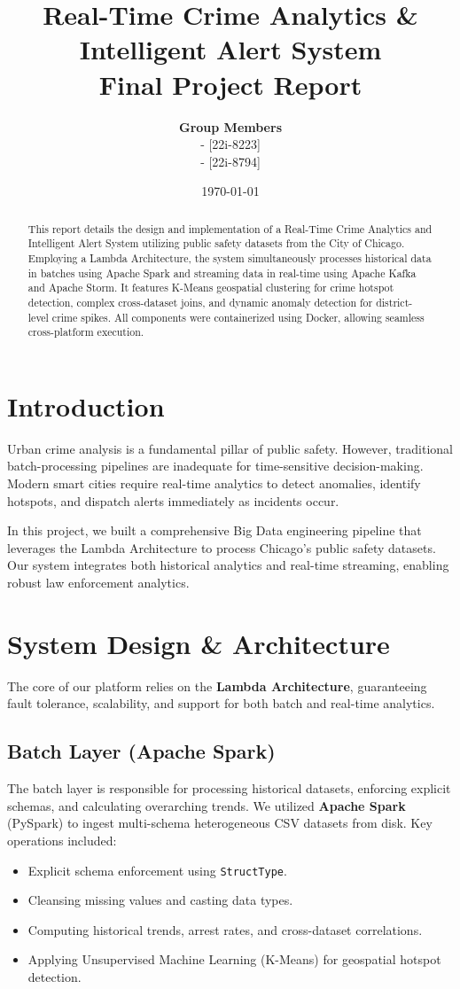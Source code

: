 \documentclass[12pt]{article}
\title{\textbf{Real-Time Crime Analytics \& Intelligent Alert System}\\
\Large Final Project Report}
\author{
    \textbf{Group Members}\\
    [Sameed Ahmed Siddiqui] - [22i-8223]\\
    [Junaid Zeb] - [22i-8794]
}
\date{\today}
\begin{document}
\maketitle

\begin{abstract}
This report details the design and implementation of a Real-Time Crime Analytics and Intelligent Alert System utilizing public safety datasets from the City of Chicago. Employing a Lambda Architecture, the system simultaneously processes historical data in batches using Apache Spark and streaming data in real-time using Apache Kafka and Apache Storm. It features K-Means geospatial clustering for crime hotspot detection, complex cross-dataset joins, and dynamic anomaly detection for district-level crime spikes. All components were containerized using Docker, allowing seamless cross-platform execution.
\end{abstract}

\tableofcontents
\newpage

\section{Introduction}
Urban crime analysis is a fundamental pillar of public safety. However, traditional batch-processing pipelines are inadequate for time-sensitive decision-making. Modern smart cities require real-time analytics to detect anomalies, identify hotspots, and dispatch alerts immediately as incidents occur. 

In this project, we built a comprehensive Big Data engineering pipeline that leverages the Lambda Architecture to process Chicago's public safety datasets. Our system integrates both historical analytics and real-time streaming, enabling robust law enforcement analytics.

\section{System Design \& Architecture}
The core of our platform relies on the \textbf{Lambda Architecture}, guaranteeing fault tolerance, scalability, and support for both batch and real-time analytics.

\subsection{Batch Layer (Apache Spark)}
The batch layer is responsible for processing historical datasets, enforcing explicit schemas, and calculating overarching trends. We utilized \textbf{Apache Spark} (PySpark) to ingest multi-schema heterogeneous CSV datasets from disk. Key operations included:
\begin{itemize}
    \item Explicit schema enforcement using \texttt{StructType}.
    \item Cleansing missing values and casting data types.
    \item Computing historical trends, arrest rates, and cross-dataset correlations.
    \item Applying Unsupervised Machine Learning (K-Means) for geospatial hotspot detection.
\end{itemize}
\end{document}
